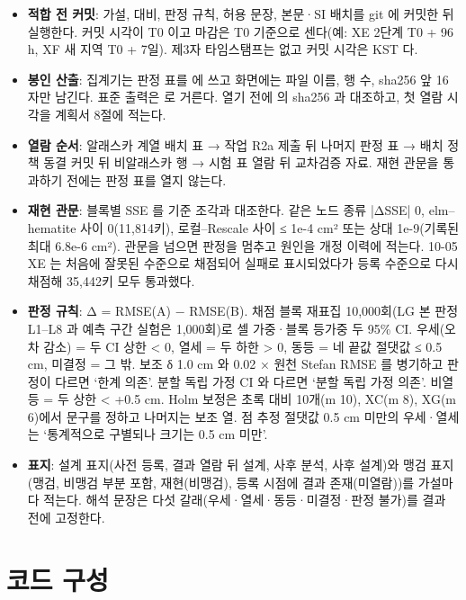 \begin{itemize}[leftmargin=1.4em, itemsep=0.15em]
  \item \textbf{적합 전 커밋}: 가설, 대비, 판정 규칙, 허용 문장, 본문·SI 배치를 git 에 커밋한 뒤 실행한다. 커밋 시각이 T0 이고 마감은 T0 기준으로 센다(예: XE 2단계 T0 + 96 h, XF 새 지역 T0 + 7일). 제3자 타임스탬프는 없고 커밋 시각은 KST 다.
  \item \textbf{봉인 산출}: 집계기는 판정 표를  에 쓰고 화면에는 파일 이름, 행 수, sha256 앞 16자만 남긴다. 표준 출력은  로 거른다. 열기 전에  의 sha256 과 대조하고, 첫 열람 시각을 계획서 8절에 적는다.
  \item \textbf{열람 순서}: 알래스카 계열 배치 표 → 작업 R2a 제출 뒤 나머지 판정 표 → 배치 정책 동결 커밋 뒤 비알래스카 행 → 시험 표 열람 뒤 교차검증 자료. 재현 관문을 통과하기 전에는 판정 표를 열지 않는다.
  \item \textbf{재현 관문}: 블록별 SSE 를 기준 조각과 대조한다. 같은 노드 종류 |ΔSSE| 0, elm–hematite 사이 0(11,814키), 로컬–Rescale 사이 ≤ 1e-4 cm² 또는 상대 1e-9(기록된 최대 6.8e-6 cm²). 관문을 넘으면 판정을 멈추고 원인을 개정 이력에 적는다. 10-05 XE 는 처음에 잘못된 수준으로 채점되어 실패로 표시되었다가 등록 수준으로 다시 채점해 35,442키 모두 통과했다.
  \item \textbf{판정 규칙}: Δ = RMSE(A) − RMSE(B). 채점 블록 재표집 10,000회(LG 본 판정 L1–L8 과 예측 구간 실험은 1,000회)로 셀 가중·블록 등가중 두 95\% CI. 우세(오차 감소) = 두 CI 상한 < 0, 열세 = 두 하한 > 0, 동등 = 네 끝값 절댓값 ≤ 0.5 cm, 미결정 = 그 밖. 보조 δ 1.0 cm 와 0.02 × 원천 Stefan RMSE 를 병기하고 판정이 다르면 ‘한계 의존’. 분할 독립 가정 CI 와 다르면 ‘분할 독립 가정 의존’. 비열등 = 두 상한 < +0.5 cm. Holm 보정은 초록 대비 10개(m 10), XC(m 8), XG(m 6)에서 문구를 정하고 나머지는 보조 열. 점 추정 절댓값 0.5 cm 미만의 우세·열세는 ‘통계적으로 구별되나 크기는 0.5 cm 미만’.
  \item \textbf{표지}: 설계 표지(사전 등록, 결과 열람 뒤 설계, 사후 분석, 사후 설계)와 맹검 표지(맹검, 비맹검 부분 포함, 재현(비맹검), 등록 시점에 결과 존재(미열람))를 가설마다 적는다. 해석 문장은 다섯 갈래(우세·열세·동등·미결정·판정 불가)를 결과 전에 고정한다.
\end{itemize}

\section{코드 구성}


